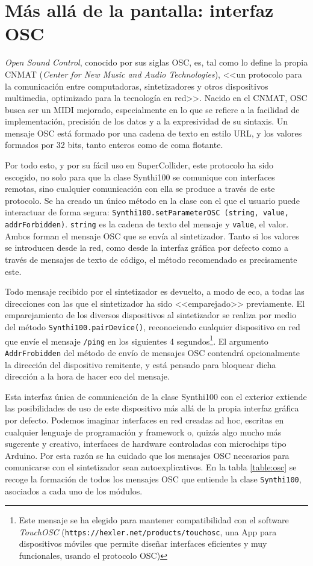 \section{Más allá de la pantalla: interfaz OSC}

\textit{Open Sound Control}, conocido por sus siglas OSC, es, tal como lo define la propia CNMAT (\textit{Center for New Music and Audio Technologies}), <<un protocolo para la comunicación entre computadoras, sintetizadores y otros dispositivos multimedia, optimizado para la tecnología en red>>. Nacido en el CNMAT, OSC busca ser un MIDI mejorado, especialmente en lo que se refiere a la facilidad de implementación, precisión de los datos y a la expresividad de su sintaxis. Un mensaje OSC está formado por una cadena de texto en estilo URL, y los valores formados por 32 bits, tanto enteros como de coma flotante. 

Por todo esto, y por su fácil uso en SuperCollider, este protocolo ha sido escogido, no solo para que la clase Synthi100 se comunique con interfaces remotas, sino cualquier comunicación con ella se produce a través de este protocolo. Se ha creado un único método en la clase con el que el usuario puede interactuar de forma segura: \texttt{Synthi100.setParameterOSC (string, value, addrForbidden)}. \texttt{string} es la cadena de texto del mensaje y \texttt{value}, el valor. Ambos forman el mensaje OSC que se envía al sintetizador. Tanto si los valores se introducen desde la red, como desde la interfaz gráfica por defecto como a través de mensajes de texto de código, el método recomendado es precisamente este.

Todo mensaje recibido por el sintetizador es devuelto, a modo de eco, a todas las direcciones con las que el sintetizador ha sido <<emparejado>> previamente. El emparejamiento de los diversos dispositivos al sintetizador se realiza por medio del método \texttt{Synthi100.pairDevice()}, reconociendo cualquier dispositivo en red que envíe el mensaje \texttt{/ping} en los siguientes 4 segundos\footnote{Este mensaje se ha elegido para mantener compatibilidad con el software \textit{TouchOSC} (\texttt{https://hexler.net/products/touchosc}, una App para dispositivos móviles que permite diseñar interfaces eficientes y muy funcionales, usando el protocolo OSC)}. El argumento \texttt{AddrFrobidden} del método de envío de mensajes OSC contendrá opcionalmente la dirección del dispositivo remitente, y está pensado para bloquear dicha dirección a la hora de hacer eco del mensaje.

Esta interfaz única de comunicación de la clase Synthi100 con el exterior extiende las posibilidades de uso de este dispositivo más allá de la propia interfaz gráfica por defecto. Podemos imaginar interfaces en red creadas ad hoc, escritas en cualquier lenguaje de programación y framework o, quizás algo mucho más sugerente y creativo, interfaces de hardware controladas con microchips tipo Arduino. Por esta razón se ha cuidado que los mensajes OSC necesarios para comunicarse con el sintetizador sean autoexplicativos. En la tabla \ref{table:osc} se recoge la formación de todos los mensajes OSC que entiende la clase \texttt{Synthi100}, asociados a cada uno de los módulos.


